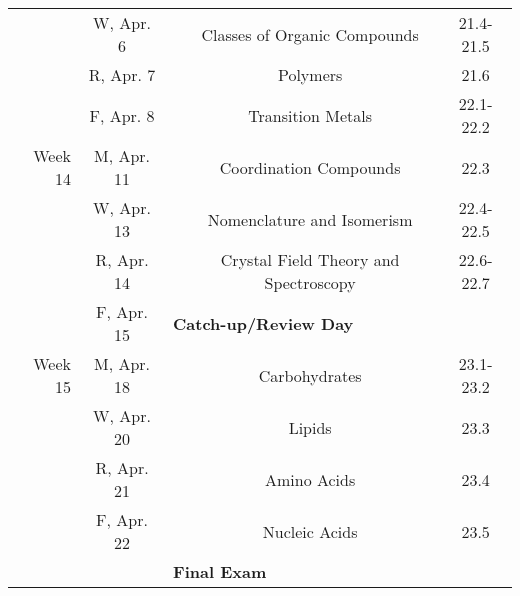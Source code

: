 \begin{tabular}{rcccc}
& W, Apr. 6&& Classes of Organic Compounds & 21.4-21.5\\
& R, Apr. 7&& Polymers & 21.6\\
& F, Apr. 8&& Transition Metals & 22.1-22.2\\
\midrule
Week 14 & M, Apr. 11&& Coordination Compounds & 22.3\\
& W, Apr. 13&& Nomenclature and Isomerism & 22.4-22.5\\
& R, Apr. 14&& Crystal Field Theory and Spectroscopy & 22.6-22.7\\
& F, Apr. 15& \multicolumn{3}{l}{\textbf{Catch-up/Review Day}}\\
\midrule
Week 15 & M, Apr. 18&& Carbohydrates & 23.1-23.2\\
& W, Apr. 20&& Lipids & 23.3\\
& R, Apr. 21&& Amino Acids & 23.4\\
& F, Apr. 22&& Nucleic Acids & 23.5\\
\midrule
\midrule
& & \multicolumn{3}{l}{\textbf{Final Exam}}\\
\end{tabular}